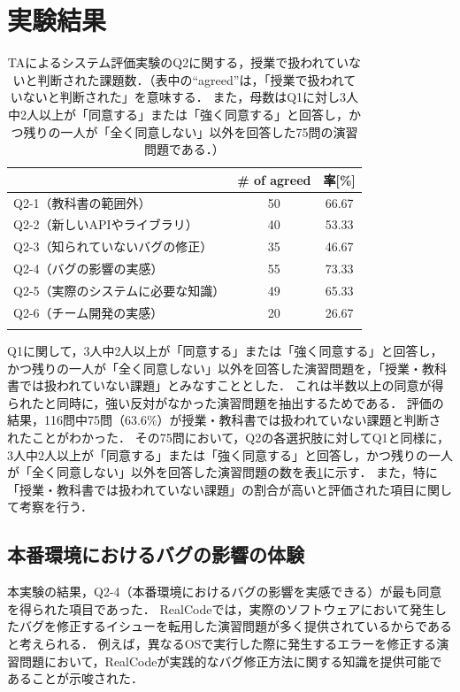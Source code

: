 \section{実験結果}

\begin{table}[b]
  \centering
  \caption{TAによるシステム評価実験のQ2に関する，授業で扱われていないと判断された課題数．（表中の``agreed''は，「授業で扱われていないと判断された」を意味する． また，母数はQ1に対し3人中2人以上が「同意する」または「強く同意する」と回答し，かつ残りの一人が「全く同意しない」以外を回答した75問の演習問題である．）}
  \label{table:ta_evaluation_result}
  \begin{tabular}{l || c | c} \Xhline{3\arrayrulewidth}
      & \# of agreed & 率[\%] \\ \hline \hline
      Q2-1（教科書の範囲外） & 50 & 66.67 \\
      Q2-2（新しいAPIやライブラリ） & 40 & 53.33 \\
      Q2-3（知られていないバグの修正） & 35 & 46.67 \\
      Q2-4（バグの影響の実感） & 55 & 73.33 \\
      Q2-5（実際のシステムに必要な知識） & 49 & 65.33 \\
      Q2-6（チーム開発の実感） & 20 & 26.67 \\  
  \Xhline{3\arrayrulewidth}
  \end{tabular}
\end{table}

Q1に関して，3人中2人以上が「同意する」または「強く同意する」と回答し，かつ残りの一人が「全く同意しない」以外を回答した演習問題を，「授業・教科書では扱われていない課題」とみなすこととした．
これは半数以上の同意が得られたと同時に，強い反対がなかった演習問題を抽出するためである．
評価の結果，116問中75問（63.6\%）が授業・教科書では扱われていない課題と判断されたことがわかった．
その75問において，Q2の各選択肢に対してQ1と同様に，3人中2人以上が「同意する」または「強く同意する」と回答し，かつ残りの一人が「全く同意しない」以外を回答した演習問題の数を表\ref{table:ta_evaluation_result}に示す．
また，特に「授業・教科書では扱われていない課題」の割合が高いと評価された項目に関して考察を行う．

\subsection*{本番環境におけるバグの影響の体験}

本実験の結果，Q2-4（本番環境におけるバグの影響を実感できる）が最も同意を得られた項目であった．
RealCodeでは，実際のソフトウェアにおいて発生したバグを修正するイシューを転用した演習問題が多く提供されているからであると考えられる．
例えば，異なるOSで実行した際に発生するエラーを修正する演習問題において，RealCodeが実践的なバグ修正方法に関する知識を提供可能であることが示唆された．

